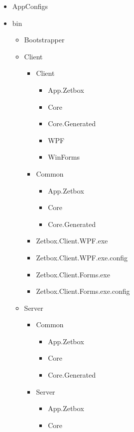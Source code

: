   	\begin{itemize}
  	  \item AppConfigs
  	  \item { bin
  	  	\begin{itemize}
  	  	  \item Bootstrapper
  	  	  \item { Client
  	  	  	\begin{itemize}
  	  	  	  \item { Client
  	  	  	  	\begin{itemize}
  	  	  	  	  \item App.Zetbox
  	  	  	  	  \item Core
  	  	  	  	  \item Core.Generated
  	  	  	  	  \item WPF
  	  	  	  	  \item WinForms
  	  	  	  	 \end{itemize}
  	  	  	  }
  	  	  	  \item { Common
  	  	  	  	\begin{itemize}
  	  	  	  	  \item App.Zetbox
  	  	  	  	  \item Core
  	  	  	  	  \item Core.Generated
  	  	  	  	 \end{itemize}
  	  	  	  }
  	  	  	  \item Zetbox.Client.WPF.exe
  	  	  	  \item Zetbox.Client.WPF.exe.config
  	  	  	  \item Zetbox.Client.Forms.exe
  	  	  	  \item Zetbox.Client.Forms.exe.config
  	  	  	\end{itemize}  
  	  	  }
  	  	  \item {Server
  	  	  	\begin{itemize}
  	  	  	  \item { Common
  	  	  	  	\begin{itemize}
  	  	  	  	  \item App.Zetbox
  	  	  	  	  \item Core
  	  	  	  	  \item Core.Generated
  	  	  	  	 \end{itemize}
  	  	  	  }
  	  	  	  \item { Server
  	  	  	  	\begin{itemize}
  	  	  	  	  \item App.Zetbox
  	  	  	  	  \item Core

\end{itemize}}
\end{itemize}}
\end{itemize}}
\end{itemize}
